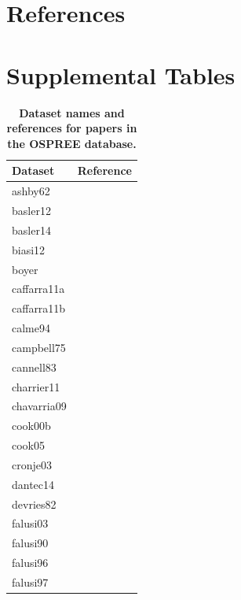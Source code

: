 \documentclass[11pt]{article}
\begin{document}
\section{References}


\newpage
\section* {Supplemental Tables}
\begin{footnotesize} 

\begingroup\footnotesize
\begin{longtable}{p{}p{}}
\caption{\textbf{Dataset names and references for papers in the OSPREE database.}} \\ 
  \hline
Dataset & Reference \\ 
  \hline \endhead  \hline
ashby62 & \citep{Ashby:1962aa} \\ 
  basler12 & \citep{Basler:2012} \\ 
  basler14 & \citep{Basler:2014aa} \\ 
  biasi12 & \citep{Biasi:2012} \\ 
  boyer & \citep{Boyer:1986} \\ 
  caffarra11a & \citep{Caffarra:2011a} \\ 
  caffarra11b & \citep{Caffarra:2011b} \\ 
  calme94 & \citep{Calme:1994aa} \\ 
  campbell75 & \citep{Campbell:1975aa} \\ 
  cannell83 & \citep{Cannell:1983} \\ 
  charrier11 & \citep{Charrier:2011aa} \\ 
  chavarria09 & \citep{Chavarria:2009aa} \\ 
  cook00b & \citep{Cook:2000aa} \\ 
  cook05 & \citep{Cook:2005aa} \\ 
  cronje03 & \citep{Cronje:2003aa} \\ 
  dantec14 & \citep{Dantec:2014aa} \\ 
  devries82 & \citep{DeVries:1982aa} \\ 
  falusi03 & \citep{Falusi:2003aa} \\ 
  falusi90 & \citep{Falusi:1990aa} \\ 
  falusi96 & \citep{Falusi:1996aa} \\ 
  falusi97 & \citep{Falusi:1997aa} \\ 

\end{longtable}
\end{footnotesize}
\end{document}
